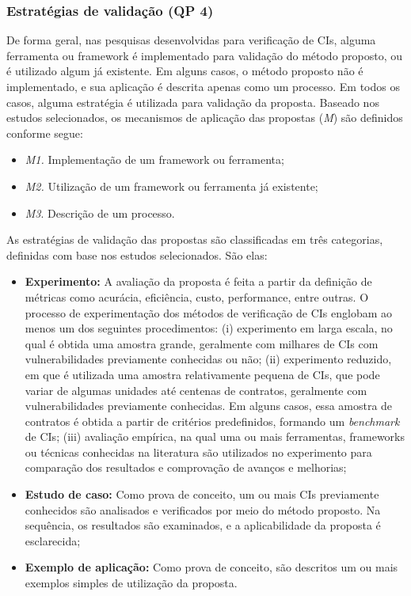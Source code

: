 \subsubsection*{Estratégias de validação (\textbf{QP 4})}

De forma geral, nas pesquisas desenvolvidas para verificação de CIs, alguma ferramenta ou framework é implementado para validação do método proposto, ou é utilizado algum já existente. Em alguns casos, o método proposto não é implementado, e sua aplicação é descrita apenas como um processo. Em todos os casos, alguma estratégia é utilizada para validação da proposta. Baseado nos estudos selecionados, os mecanismos de aplicação das propostas (\textit{M}) são definidos conforme segue:
\begin{itemize}
    \item \textit{M1.} Implementação de um framework ou ferramenta;
    \item \textit{M2.} Utilização de um framework ou ferramenta já existente;
    \item \textit{M3}. Descrição de um processo.
\end{itemize}

As estratégias de validação das propostas são classificadas em três categorias, definidas com base nos estudos selecionados. São elas:
\begin{itemize}
    \item \textbf{Experimento:} A avaliação da proposta é feita a partir da definição de métricas como acurácia, eficiência, custo, performance, entre outras. O processo de experimentação dos métodos de verificação de CIs englobam ao menos um dos seguintes procedimentos: (i) experimento em larga escala, no qual é obtida uma amostra grande, geralmente com milhares de CIs com vulnerabilidades previamente conhecidas ou não; (ii) experimento reduzido, em que é utilizada uma amostra relativamente pequena de CIs, que pode variar de algumas unidades até centenas de contratos, geralmente com vulnerabilidades previamente conhecidas. Em alguns casos, essa amostra de contratos é obtida a partir de critérios predefinidos, formando um \textit{benchmark} de CIs; (iii) avaliação empírica, na qual uma ou mais ferramentas, frameworks ou técnicas conhecidas na literatura são utilizados no experimento para comparação dos resultados e comprovação de avanços e melhorias;
    \item \textbf{Estudo de caso:} Como prova de conceito, um ou mais CIs previamente conhecidos são analisados e verificados por meio do método proposto. Na sequência, os resultados são examinados, e a aplicabilidade da proposta é esclarecida;  
    \item \textbf{Exemplo de aplicação:} Como prova de conceito, são descritos um ou mais exemplos simples de utilização da proposta.  
\end{itemize}

